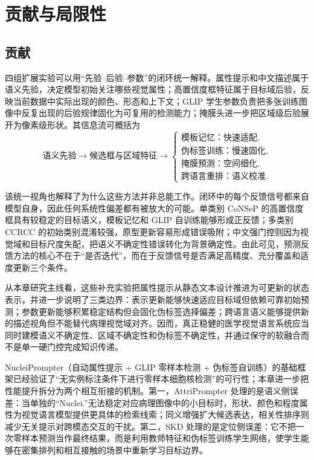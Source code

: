 \section{贡献与局限性}

\subsection{贡献}
四组扩展实验可以用“先验--后验--参数”的闭环统一解释。属性提示和中文描述属于语义先验，决定模型初始关注哪些视觉属性；高置信度框特征属于目标域后验，反映当前数据中实际出现的颜色、形态和上下文；GLIP 学生参数负责把多张训练图像中反复出现的后验规律固化为可复用的检测能力；掩膜头进一步把区域级后验展开为像素级形状。其信息流可概括为
\begin{equation}
\text{语义先验}
\rightarrow
\text{候选框与区域特征}
\rightarrow
\begin{cases}
\text{模板记忆：快速适配},\\
\text{伪标签训练：慢速固化},\\
\text{掩膜预测：空间细化},\\
\text{跨语言重排：语义校准}.
\end{cases}
\end{equation}

该统一视角也解释了为什么这些方法并非总能工作。闭环中的每个反馈信号都来自模型自身，因此任何系统性偏差都有被放大的可能。单类别 CoNSeP 的高置信度框具有较稳定的目标语义，模板记忆和 GLIP 自训练能够形成正反馈；多类别 CCRCC 的初始类别混淆较强，原型更新容易形成错误吸附；中文强门控则因为视觉域和目标尺度失配，把语义不确定性错误转化为背景确定性。由此可见，预测反馈方法的核心不在于“是否迭代”，而在于反馈信号是否满足高精度、充分覆盖和适度更新三个条件。

从本章研究主线看，这些补充实验把属性提示从静态文本设计推进为可更新的状态表示，并进一步说明了三类边界：表示更新能够快速适应目标域但依赖可靠初始预测；参数更新能够积累稳定结构但会固化伪标签选择偏差；跨语言语义能够提供新的描述视角但不能替代病理视觉域对齐。因而，真正稳健的医学视觉语言系统应当同时建模语义不确定性、区域不确定性和伪标签不确定性，并通过保守的软融合而不是单一硬门控完成知识传递。

NucleiPrompter（自动属性提示 + GLIP 零样本检测 + 伪标签自训练）的基础框架已经验证了“无实例标注条件下进行零样本细胞核检测”的可行性；本章进一步把性能提升拆分为两个相互衔接的机制。第一，AttriPrompter 处理的是语义侧误差：当单独的“Nuclei.”无法稳定对应病理图像中的小目标时，形状、颜色和程度属性为视觉语言模型提供更具体的检索线索；同义增强扩大候选表达，相关性排序则减少无关提示对跨模态交互的干扰。第二，SKD 处理的是定位侧误差：它不把一次零样本预测当作最终结果，而是利用教师特征和伪标签训练学生网络，使学生能够在密集排列和相互接触的场景中重新学习目标边界。

